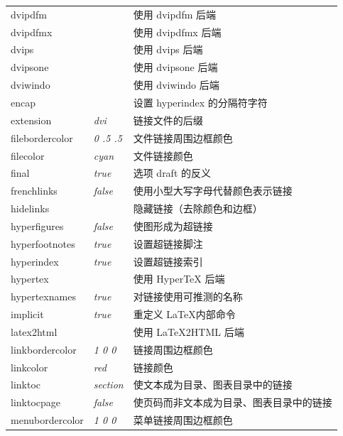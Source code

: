 \documentclass{article}
\begin{document}
\begin{longtable}{@{}>{\ttfamily}llp{7cm}@{}}
dvipdfm            &                        & 使用 \textsf{dvipdfm} 后端\\
dvipdfmx           &                        & 使用 \textsf{dvipdfmx} 后端\\
dvips              &                        & 使用 \textsf{dvips} 后端\\
dvipsone           &                        & 使用 \textsf{dvipsone} 后端\\
dviwindo           &                        & 使用 \textsf{dviwindo} 后端\\
encap              &                        & 设置 hyperindex 的分隔符字符\\
extension          & \textit{dvi}           & 链接文件的后缀\\
filebordercolor    & \textit{0 .5 .5}       & 文件链接周围边框颜色\\
filecolor          & \textit{cyan}          & 文件链接颜色\\
final              & \textit{true}          & 选项 draft 的反义\\
frenchlinks        & \textit{false}         & 使用小型大写字母代替颜色表示链接\\
hidelinks          &                        & 隐藏链接（去除颜色和边框）\\
hyperfigures       & \textit{false}         & 使图形成为超链接\\
hyperfootnotes     & \textit{true}          & 设置超链接脚注\\
hyperindex         & \textit{true}          & 设置超链接索引\\
hypertex           &                        & 使用 \textsf{Hyper\TeX} 后端\\
hypertexnames      & \textit{true}          & 对链接使用可推测的名称\\
implicit           & \textit{true}          & 重定义 \LaTeX 内部命令\\
latex2html         &                        & 使用 \textsf{\LaTeX2HTML} 后端\\
linkbordercolor    & \textit{1 0 0}         & 链接周围边框颜色\\
linkcolor          & \textit{red}           & 链接颜色\\
linktoc            & \textit{section}       & 使文本成为目录、图表目录中的链接\\
linktocpage        & \textit{false}         & 使页码而非文本成为目录、图表目录中的链接\\
menubordercolor    & \textit{1 0 0}         & 菜单链接周围边框颜色\\

\end{longtable}
\end{document}
